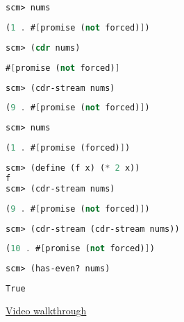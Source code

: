 \begin{blocksection}
\begin{lstlisting}[language=Scheme]
scm> nums
\end{lstlisting}
\begin{solution}[0.25in]
\begin{lstlisting}[language=Scheme]
(1 . #[promise (not forced)])
\end{lstlisting}
\end{solution}

\begin{lstlisting}[language=Scheme]
scm> (cdr nums)
\end{lstlisting}
\begin{solution}[0.25in]
\begin{lstlisting}[language=Scheme]
#[promise (not forced)]
\end{lstlisting}
\end{solution}

\begin{lstlisting}[language=Scheme]
scm> (cdr-stream nums)
\end{lstlisting}
\begin{solution}[0.25in]
\begin{lstlisting}[language=Scheme]
(9 . #[promise (not forced)])
\end{lstlisting}
\end{solution}

\begin{lstlisting}[language=Scheme]
scm> nums
\end{lstlisting}
\begin{solution}[0.25in]
\begin{lstlisting}[language=Scheme]
(1 . #[promise (forced)])
\end{lstlisting}
\end{solution}

\begin{lstlisting}[language=Scheme]
scm> (define (f x) (* 2 x))
f
scm> (cdr-stream nums)
\end{lstlisting}
\begin{solution}[0.25in]
\begin{lstlisting}[language=Scheme]
(9 . #[promise (not forced)])
\end{lstlisting}
\end{solution}

\begin{lstlisting}[language=Scheme]
scm> (cdr-stream (cdr-stream nums))
\end{lstlisting}
\begin{solution}[0.25in]
\begin{lstlisting}[language=Scheme]
(10 . #[promise (not forced)])
\end{lstlisting}
\end{solution}

\begin{lstlisting}[language=Scheme]
scm> (has-even? nums)
\end{lstlisting}
\begin{solution}[0.5in]
\begin{lstlisting}[language=Scheme]
True
\end{lstlisting}
\href{https://youtu.be/TGSYZvoIMnE}{Video walkthrough}
\end{solution}
\end{blocksection}
